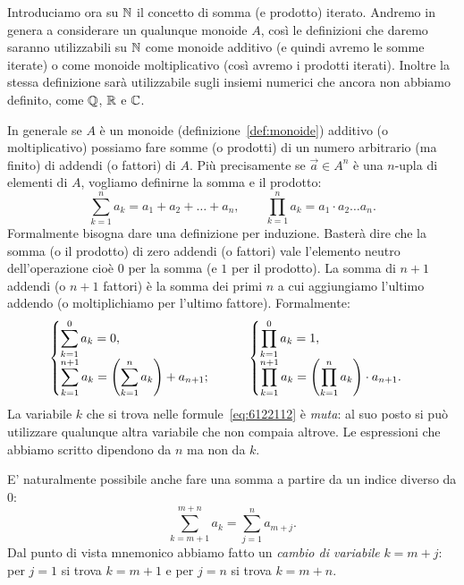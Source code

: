 Introduciamo ora su ${\mathbb N}$ il concetto di somma (e prodotto) iterato.
Andremo in genera a considerare un qualunque monoide $A$, così 
le definizioni che daremo saranno utilizzabili su ${\mathbb N}$ 
come monoide additivo (e quindi avremo le somme iterate)
o come monoide moltiplicativo (così avremo i prodotti iterati).
Inoltre la stessa definizione sarà utilizzabile 
sugli insiemi numerici che ancora non abbiamo definito, come 
${\mathbb Q}$, ${\mathbb R}$ e ${\mathbb C}$.

In generale se $A$ è un monoide (definizione~\ref{def:monoide}) additivo 
(o moltiplicativo) possiamo fare somme (o prodotti) di un numero 
arbitrario (ma finito) di addendi (o fattori) di $A$.
Più precisamente se $\vec a \in A^n$ 
è una $n$-upla di elementi di $A$, 
vogliamo definirne la somma e il prodotto:
\begin{equation}\label{eq:6122112}
\sum_{k=1}^n a_k = a_1 + a_2 + \dots + a_n,
\qquad 
\prod_{k=1}^n a_k = a_1 \cdot a_2 \dots a_n.
\end{equation}
Formalmente bisogna dare una definizione per induzione. 
Basterà dire che la somma (o il prodotto)
di zero addendi (o fattori) vale l'elemento neutro 
dell'operazione cioè $0$ per la somma (e $1$ per il prodotto).
La somma di $n+1$ addendi (o $n+1$ fattori) è la somma dei primi $n$ 
a cui aggiungiamo l'ultimo addendo (o moltiplichiamo per l'ultimo fattore).
Formalmente:
\[
  \begin{cases}
    \displaystyle\sum_{k=1}^{0} a_k = 0, \\
    \displaystyle\sum_{k=1}^{n+1} a_k = {\left( \sum_{k=1}^{n} a_k \right)} + a_{n+1};
  \end{cases}  \qquad
  \begin{cases}
    \displaystyle\prod_{k=1}^{0} a_k = 1, \\
    \displaystyle\prod_{k=1}^{n+1} a_k = {\left( \prod_{k=1}^{n} a_k \right)} \cdot a_{n+1}.
  \end{cases}
\]
La variabile $k$ che si trova nelle formule~\eqref{eq:6122112} è \emph{muta}: 
al suo posto si può utilizzare qualunque altra variabile che non
compaia altrove.
Le espressioni che abbiamo scritto dipendono da $n$ ma non da $k$.

E' naturalmente possibile anche fare una somma a partire da un indice 
diverso da $0$:
\[
  \sum_{k=m+1}^{m+n} a_k = \sum_{j=1}^{n} a_{m+j}.
\]
Dal punto di vista mnemonico abbiamo fatto 
un \emph{cambio di variabile} $k=m+j$:
per $j=1$ si trova $k=m+1$ e per $j=n$ si trova $k=m+n$.


